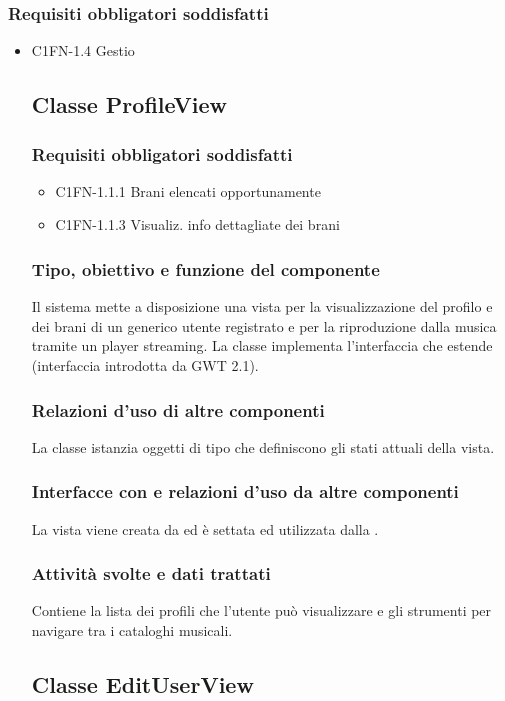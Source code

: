 \subsubsection*{Requisiti obbligatori soddisfatti}
\begin{itemize}
   \item C1FN-1.4 Gestio\subsection{Classe ProfileView}
\subsubsection*{Requisiti obbligatori soddisfatti}
\begin{itemize}
   \item C1FN-1.1.1 Brani elencati opportunamente
   \item C1FN-1.1.3 Visualiz. info dettagliate dei brani
\end{itemize}
\subsubsection*{Tipo, obiettivo e funzione del componente}
Il sistema mette a disposizione una vista per la visualizzazione del profilo e
dei brani di un generico utente registrato e per la riproduzione dalla musica
tramite un player streaming. La classe  implementa
l'interfaccia  che estende  (interfaccia introdotta
da GWT 2.1).
\subsubsection*{Relazioni d'uso di altre componenti} 
La classe istanzia oggetti di tipo  che definiscono gli stati
attuali della vista.
\subsubsection*{Interfacce con e relazioni d'uso da altre componenti}
 La vista viene creata da  ed \`e settata ed utilizzata dalla
 .
 \subsubsection*{Attivit\`a svolte e dati trattati}
Contiene la lista dei profili che l'utente pu\`o visualizzare e gli strumenti
per navigare tra i cataloghi musicali.

\subsection{Classe EditUserView}

\end{itemize}
